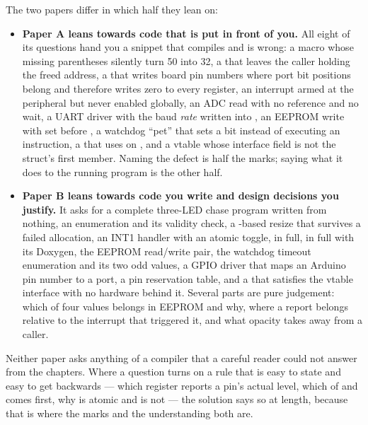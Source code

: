 The two papers differ in which half they lean on:
\begin{itemize}
  \item \textbf{Paper A leans towards code that is put in front of you.} All eight of its questions
    hand you a snippet that compiles and is wrong: a macro whose missing parentheses silently turn
    50 into 32, a  that leaves the caller holding the freed address, a 
    that writes board pin numbers where port bit positions belong and therefore writes zero to
    every register, an interrupt armed at the peripheral but never enabled globally, an ADC read
    with no reference and no wait, a UART driver with the baud \emph{rate} written into
    , an EEPROM write with  set before , a watchdog ``pet'' that
    sets a bit instead of executing an instruction, a  that uses \code{^=} on
    , and a vtable whose interface field is not the struct's first member. Naming the
    defect is half the marks; saying what it does to the running program is the other half.
  \item \textbf{Paper B leans towards code you write and design decisions you justify.} It asks for
    a complete three-LED chase program written from nothing, an enumeration and its validity check,
    a -based resize that survives a failed allocation, an INT1 handler with an
    atomic toggle,  in full,  in full with its Doxygen, the
    EEPROM read/write pair, the watchdog timeout enumeration and its two odd values, a GPIO driver
    that maps an Arduino pin number to a port, a pin reservation table, and a 
    that satisfies the vtable interface with no hardware behind it. Several parts are pure
    judgement: which of four values belongs in EEPROM and why, where a report belongs relative to
    the interrupt that triggered it, and what opacity takes away from a caller.
\end{itemize}

Neither paper asks anything of a compiler that a careful reader could not answer from the
chapters. Where a question turns on a rule that is easy to state and easy to get backwards ---
which register reports a pin's actual level, which of  and  comes first, why
 is atomic and  is not --- the solution says so at
length, because that is where the marks and the understanding both are.

